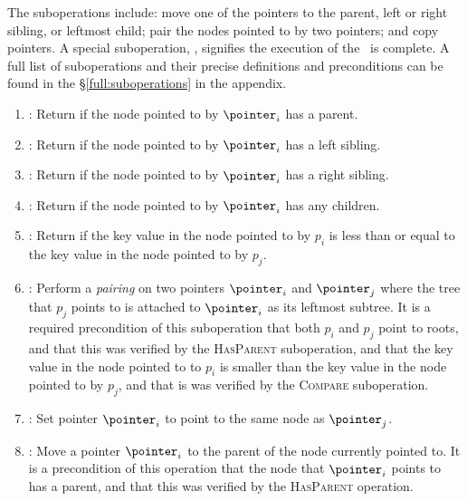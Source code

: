 \begin{shortonly}
The suboperations include: move one of the pointers to the parent, left or right sibling, or leftmost child; pair the nodes pointed to by two pointers; and copy pointers.
A special suboperation, , signifies the execution of the \opEm\ is complete.
A full list of suboperations and their precise definitions and preconditions can be found in the \S\ref{full:suboperations} in the appendix.
\end{shortonly}
\begin{fullonly}
\begin{enumerate}

\item {} : Return if the node pointed to by $\pointer_i$ has a parent.

\item {}: Return if the node pointed to by $\pointer_i$ has a left sibling.

\item {}: Return if the node pointed to by $\pointer_i$ has a right sibling.

\item {}:  Return if the node pointed to by $\pointer_i$ has any children.

\item {}: Return if the key value in the node pointed to by $p_i$ is less than or equal to the key value in the node pointed to by $p_j$.

\item {}: Perform a \emph{pairing} on two pointers $\pointer_i$ and $\pointer_j$ where the tree that $p_j$ points to is attached to $\pointer_i$ as its leftmost subtree. It is a required precondition of this suboperation that both $p_i$ and $p_j$ point to roots, and that this was verified by the \textsc{HasParent} suboperation, and that the key value in the node pointed to to $p_i$ is smaller than the key value in the node pointed to by $p_j$, and that is was verified by the \textsc{Compare} suboperation.

\item {}: Set pointer $\pointer_i$ to point to the same node as $\pointer_j$.

\item {}: Move a pointer $\pointer_i$ to the parent of the node currently pointed to.
It is a precondition of this operation that the node that $\pointer_i$ points to has a parent, and that this was verified by the \textsc{HasParent} operation.


\end{enumerate}
\end{fullonly}
